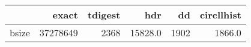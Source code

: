 \begin{tabular}{lrrrrr}
\toprule
{} &     exact &  tdigest &      hdr &    dd &  circllhist \\
\midrule
bsize &  37278649 &     2368 &  15828.0 &  1902 &      1866.0 \\
\bottomrule
\end{tabular}
